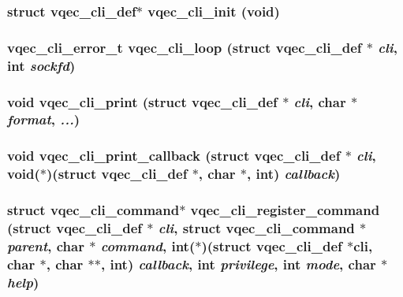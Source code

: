 \subsubsection{\setlength{\rightskip}{0pt plus 5cm}struct \bf{vqec\_\-cli\_\-def}$\ast$ vqec\_\-cli\_\-init (void)}\label{vqec__cli_8h_bd6c8f21be6c2b3db89e3308d989ec81}


\subsubsection{\setlength{\rightskip}{0pt plus 5cm}\bf{vqec\_\-cli\_\-error\_\-t} vqec\_\-cli\_\-loop (struct \bf{vqec\_\-cli\_\-def} $\ast$ {\em cli}, int {\em sockfd})}\label{vqec__cli_8h_38464aa631f910feab674f0714d21a4f}


\subsubsection{\setlength{\rightskip}{0pt plus 5cm}void vqec\_\-cli\_\-print (struct \bf{vqec\_\-cli\_\-def} $\ast$ {\em cli}, char $\ast$ {\em format},  {\em ...})}\label{vqec__cli_8h_b36754687a604f5149a45d60547fbd5c}


\subsubsection{\setlength{\rightskip}{0pt plus 5cm}void vqec\_\-cli\_\-print\_\-callback (struct \bf{vqec\_\-cli\_\-def} $\ast$ {\em cli}, void($\ast$)(struct \bf{vqec\_\-cli\_\-def} $\ast$, char $\ast$, int) {\em callback})}\label{vqec__cli_8h_3facbceee2638d90385093fb5f5d52c0}


\subsubsection{\setlength{\rightskip}{0pt plus 5cm}struct \bf{vqec\_\-cli\_\-command}$\ast$ vqec\_\-cli\_\-register\_\-command (struct \bf{vqec\_\-cli\_\-def} $\ast$ {\em cli}, struct \bf{vqec\_\-cli\_\-command} $\ast$ {\em parent}, char $\ast$ {\em command}, int($\ast$)(struct \bf{vqec\_\-cli\_\-def} $\ast$cli, char $\ast$, char $\ast$$\ast$, int) {\em callback}, int {\em privilege}, int {\em mode}, char $\ast$ {\em help})}\label{vqec__cli_8h_282f683d908651648579da4513ff2831}


